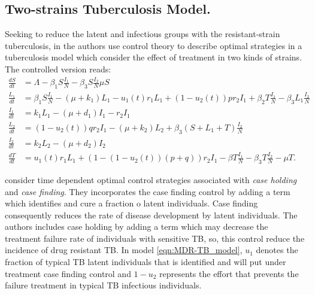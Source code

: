 \subsection{Two-strains Tuberculosis Model.}
Seeking to reduce the latent and infectious groups with the 
resistant-strain tuberculosis, in \cite{Lenhart2002} the authors  use 
control theory to describe optimal strategies in a tuberculosis model 
which consider the effect of treatment in two kinds of strains. The 
controlled version reads:
	\begin{equation}\label{eqn:MDR-TB_model}
	  \begin{aligned}
	    \frac{dS}{dt} &=
		    \Lambda - \beta_1 S \frac{I_1}{N} 
		    - \beta_3 S \frac{I_2}{N}
		    \mu S
		  \\
		  \frac{L_1}{dt} &=
			  \beta_1 S \frac{I_1}{N}
			  - (\mu + k_1) L_1
			  - u_1 (t) r_1 L_1
			  + (1 - u_2 (t)) p r_2 I_1
				+ \beta_2 T \frac{I_1}{N}
				- \beta_3 L_1 \frac{I_2}{N}
			\\
			\frac{I_1}{dt} &= 
				k_1 L_1
				- (\mu + d_1) I_1
				-r_2 I_1
			\\
			\frac{L_2}{dt} &=
				(1 - u_2(t)) q r_2 I_1
				- (\mu + k_2) L_2
				+ \beta_3 (S + L_1 + T) \frac{I_2}{N}
			\\
			\frac{I_2}{dt} &=
				k_2 L_2 - (\mu + d_2) I_2
			\\
			\frac{d T}{dt} &=
				u_1(t) r_1 L_1
				+ (1 - (1 - u_2(t))(p + q)) r_2 I_1
				- \beta T \frac{I_1}{N}
				- \beta_3 T \frac{I_2}{N}
				-\mu T.
	  \end{aligned}
	\end{equation}

	\citeauthor*{Lenhart2002} consider time dependent 
optimal control strategies associated with \emph{case holding} and 
\emph{case finding}. They incorporates the case finding control by adding a 
term which identifies and  cure a fraction o latent individuals. Case finding
consequently reduces the rate of disease development by latent individuals. The
authors includes case holding by adding a term which may decrease the treatment
failure rate of individuals with sensitive  TB, so, this control reduce the
incidence of drug resistant TB. In model \eqref{eqn:MDR-TB_model}, $u_1$ denotes
the fraction of typical TB latent individuals that is identified and will put
under treatment \textemdash case finding control \textemdash and $1 - u_2$
represents the effort that prevents the failure treatment in typical TB
infectious individuals.

